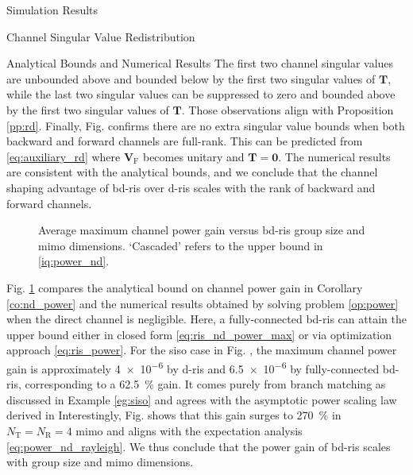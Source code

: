 \documentclass[journal]{IEEEtran}
\begin{document}
\begin{section}{Simulation Results}
\begin{subsection}{Channel Singular Value Redistribution}
\begin{subsubsection}{Analytical Bounds and Numerical Results}
			The first two channel singular values are unbounded above and bounded below by the first two singular values of $\mathbf{T}$, while the last two singular values can be suppressed to zero and bounded above by the first two singular values of $\mathbf{T}$.
			Those observations align with Proposition \ref{pp:rd}.
			Finally, Fig.  confirms there are no extra singular value bounds when both backward and forward channels are full-rank.
			This can be predicted from \eqref{eq:auxiliary_rd} where $\mathbf{V}_\mathrm{F}$ becomes unitary and $\mathbf{T}=\mathbf{0}$.
			The numerical results are consistent with the analytical bounds, and we conclude that the channel shaping advantage of \gls{bd}-\gls{ris} over \gls{d}-\gls{ris} scales with the rank of backward and forward channels.

			\begin{figure}[!t]
				\centering
				\caption{
					Average maximum channel power gain versus \gls{bd}-\gls{ris} group size and \gls{mimo} dimensions.
					`Cascaded' refers to the upper bound in \eqref{iq:power_nd}.
				}
				\label{fg:power_bond}
			\end{figure}

			Fig. \ref{fg:power_bond} compares the analytical bound on channel power gain in Corollary \ref{co:nd_power} and the numerical results obtained by solving problem \eqref{op:power} when the direct channel is negligible.
			Here, a fully-connected \gls{bd}-\gls{ris} can attain the upper bound either in closed form \eqref{eq:ris_nd_power_max} or via optimization approach \eqref{eq:ris_power}.
			For the \gls{siso} case in Fig. , the maximum channel power gain is approximately \num{4e-6} by \gls{d}-\gls{ris} and \num{6.5e-6} by fully-connected \gls{bd}-\gls{ris}, corresponding to a \qty{62.5}{\percent} gain.
			It comes purely from branch matching as discussed in Example \ref{eg:siso} and agrees with the asymptotic power scaling law derived in \cite[(30)]{Shen2020a}
			Interestingly, Fig.  shows that this gain surges to \qty{270}{\percent} in $N_\mathrm{T}=N_\mathrm{R}=4$ \gls{mimo} and aligns with the expectation analysis \eqref{eq:power_nd_rayleigh}.
			We thus conclude that the power gain of \gls{bd}-\gls{ris} scales with group size and \gls{mimo} dimensions.
		\end{subsubsection}
	\end{subsection}


\end{section}
\end{document}
